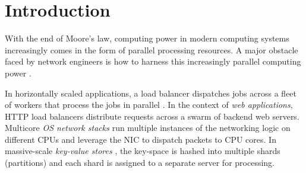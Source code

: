\section{Introduction}\label{sec:introduction}









With the end of Moore's law, computing power in modern computing systems increasingly comes in the form of parallel processing resources.  A major obstacle faced by network engineers is how to harness this increasingly parallel computing power \cite{265065, 10.5555/3307441.3307467, 10.1145/2815400.2815423, 10.1145/3098822.3098826, 10.5555/3154630.3154639}.

In horizontally scaled applications, a load balancer dispatches jobs across a fleet of workers that process the jobs in parallel \cite{10.5555/3235491}.  In the context of \emph{web applications}, HTTP load balancers \cite{194966, 211279, 9552525} distribute requests across a swarm of backend web servers.  %
Multicore \emph{OS network stacks} \cite{211263, 10.1145/3359989.3365412, 10.1145/3452296.3472914} run multiple instances of the networking logic on different CPUs and leverage the NIC to dispatch packets to CPU cores. %
In massive-scale \emph{key-value stores} \cite{ghigoff2021bmc}, the key-space is hashed into multiple shards (partitions) and each shard is assigned to a separate server for processing.

